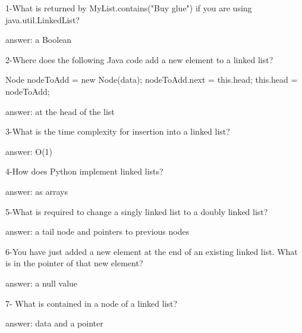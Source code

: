 1-What is returned by MyList.contains("Buy glue") if you are using java.util.LinkedList?

answer: a Boolean

2-Where does the following Java code add a new element to a linked list?

Node nodeToAdd = new Node(data);
nodeToAdd.next = this.head;
this.head = nodeToAdd;

answer: at the head of the list

3-What is the time complexity for insertion into a linked list?

answer: O(1)

4-How does Python implement linked lists?

answer: as arrays

5-What is required to change a singly linked list to a doubly linked list?

answer: a tail node and pointers to previous nodes

6-You have just added a new element at the end of an existing linked list. What is in the pointer of that new element?

answer: a null value

7- What is contained in a node of a linked list?

answer: data and a pointer
